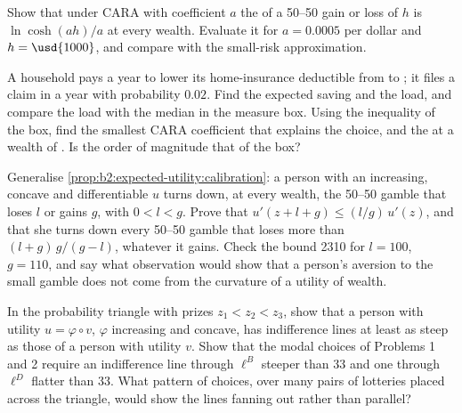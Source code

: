 \begin{exercise}[$\star\star$]\label{exo:b2:expected-utility:8}
Show that under CARA with coefficient $a$ the  of a 50--50 gain or loss of $h$ is
$\ln\cosh(ah)/a$ at every wealth. Evaluate it for $a = \num{0.0005}$ per dollar and $h = \usd{1000}$,
and compare with the small-risk approximation.
\end{exercise}

\begin{exercise}[$\star\star$]\label{exo:b2:expected-utility:9}
A household pays  a year to lower its home-insurance deductible from  to ;
it files a claim in a year with probability $0.02$. Find the expected saving and the load, and compare
the load with the median in the measure box. Using the inequality of the box, find the smallest CARA
coefficient that explains the choice, and the  at a wealth of
. Is the order of magnitude that of the box?
\end{exercise}

\begin{exercise}[$\star\star\star$]\label{exo:b2:expected-utility:10}
Generalise \cref{prop:b2:expected-utility:calibration}: a person with an increasing, concave and
differentiable $u$ turns down, at every wealth, the 50--50 gamble that loses $l$ or gains $g$, with $0
< l < g$. Prove that $u'(z + l + g) \le (l/g)\,u'(z)$, and that she turns down every 50--50 gamble that
loses more than $(l + g)\,g/(g - l)$, whatever it gains. Check the bound \num{2310} for $l = 100$, $g =
110$, and say what observation would show that a person's aversion to the small gamble does not come
from the curvature of a utility of wealth.
\end{exercise}

\begin{exercise}[$\star\star\star$]\label{exo:b2:expected-utility:11}
In the probability triangle with prizes $z_1 < z_2 < z_3$, show that a person with utility $u = \varphi
\circ v$, $\varphi$ increasing and concave, has indifference lines at least as steep as those of a
person with utility $v$. Show that the modal choices of Problems 1 and 2 require an indifference line
through $\ell^{B}$ steeper than $33$ and one through $\ell^{D}$ flatter than $33$. What pattern of
choices, over many pairs of lotteries placed across the triangle, would show the lines fanning out
rather than parallel?
\end{exercise}


